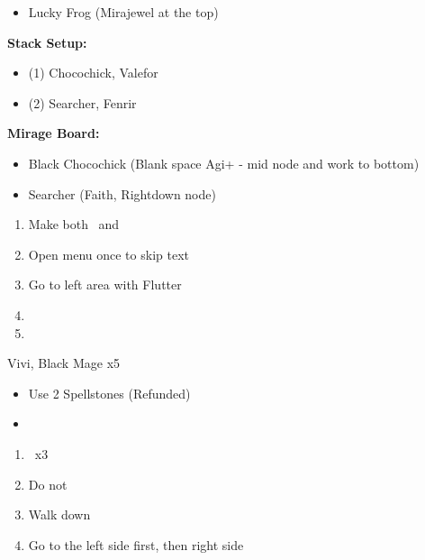 \begin{menu}
    \begin{itemize}
        \item Lucky Frog (Mirajewel at the top)
    \end{itemize}
\textbf{Stack Setup:}
    \begin{itemize}
        \item (1) Chocochick, Valefor
        \item (2) Searcher, Fenrir
    \end{itemize}
\textbf{Mirage Board:}
    \begin{itemize}
        \item Black Chocochick (Blank space Agi+ - mid node and work to bottom)
        \item Searcher (Faith, Rightdown node)
    \end{itemize}
\end{menu}

\begin{enumerate}[resume]
    \item Make both \lann\ and \reynn\ \smallc\
    \item Open menu once to skip text
    \item Go to left area with Flutter
    \item {}
    \item {}
\end{enumerate}

\begin{battle}[]{Vivi, Black Mage x5}
    \begin{itemize}
        \item Use 2 Spellstones (Refunded)
        \item \imprism\
    \end{itemize}
\end{battle}

\begin{enumerate}[resume]
    \item \cs\ x3
    \item Do not \save\
    \item Walk down
    \item Go to the left side first, then right side
\end{enumerate}